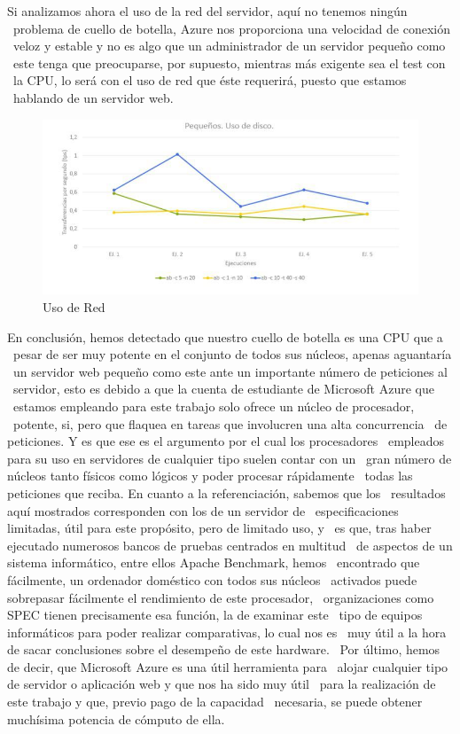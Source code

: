 \documentclass[11pt,twoside,a4paper]{book}
\renewcommand{\baselinestretch}{1.2}
\begin{document}
Si analizamos ahora el uso de la red del servidor, aquí no tenemos ningún \
problema de cuello de botella, Azure nos proporciona una velocidad de conexión \
veloz y estable y no es algo que un administrador de un servidor pequeño como \
este tenga que preocuparse, por supuesto, mientras más exigente sea el test con \
la CPU, lo será con el uso de red que éste requerirá, puesto que estamos \
hablando de un servidor web. \newline

\begin{figure}
   \includegraphics[width=\textwidth]{grafica4.jpg}%
   \caption{Uso de Red}
   \label{Fig5}
\end{figure}

En conclusión, hemos detectado que nuestro cuello de botella es una CPU que a \
pesar de ser muy potente en el conjunto de todos sus núcleos, apenas aguantaría \
un servidor web pequeño como este ante un importante número de peticiones al \
servidor, esto es debido a que la cuenta de estudiante de Microsoft Azure que \
estamos empleando para este trabajo solo ofrece un núcleo de procesador, \
potente, si, pero que flaquea en tareas que involucren una alta concurrencia \
de peticiones. Y es que ese es el argumento por el cual los procesadores \
empleados para su uso en servidores de cualquier tipo suelen contar con un \
gran número de núcleos tanto físicos como lógicos y poder procesar rápidamente \
todas las peticiones que reciba. En cuanto a la referenciación, sabemos que los \
resultados aquí mostrados corresponden con los de un servidor de \
especificaciones limitadas, útil para este propósito, pero de limitado uso, y \
es que, tras haber ejecutado numerosos bancos de pruebas centrados en multitud \
de aspectos de un sistema informático, entre ellos Apache Benchmark, hemos \
encontrado que fácilmente, un ordenador doméstico con todos sus núcleos \
activados puede sobrepasar fácilmente el rendimiento de este procesador, \
organizaciones como SPEC tienen precisamente esa función, la de examinar este \
tipo de equipos informáticos para poder realizar comparativas, lo cual nos es \
muy útil a la hora de sacar conclusiones sobre el desempeño de este hardware. \
Por último, hemos de decir, que Microsoft Azure es una útil herramienta para \
alojar cualquier tipo de servidor o aplicación web y que nos ha sido muy útil \
para la realización de este trabajo y que, previo pago de la capacidad \
necesaria, se puede obtener muchísima potencia de cómputo de ella.



\appendix

\renewcommand{\baselinestretch}{1.2}



\cite{KM2000}
\end{document}
